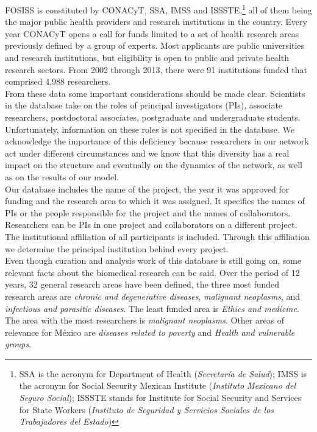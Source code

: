 \documentclass{bmcart}
\begin{document}
FOSISS is constituted by CONACyT, SSA, IMSS and ISSSTE,\footnote{SSA
  is the acronym for Department of Health (\emph{Secretar\'ia de
    Salud}); IMSS is the acronym for Social Security Mexican Institute
  (\emph{Instituto Mexicano del Seguro Social}); ISSSTE stands for
  Institute for Social Security and Services for State Workers
  (\emph{Instituto de Seguridad y Servicios Sociales de los
    Trabajadores del Estado})} all of them being the major public
health providers and research institutions in the country. Every year
CONACyT opens a call for funds limited to a set of health research
areas previously defined by a group of experts. Most applicants are
public universities and research institutions, but eligibility is open
to public and private health research sectors.  From 2002 through
2013, there were 91 institutions funded that comprised 4,988
researchers.\\

From these data some important considerations should be made
clear. Scientists in the database take on the roles of principal
investigators (PIs), associate researchers, postdoctoral associates,
postgraduate and undergraduate students.  Unfortunately, information
on these roles is not specified in the database.  We acknowledge the
importance of this deficiency because researchers in our network act
under different circumstances and we know that this diversity has a
real impact on the structure and eventually on the dynamics of the
network, as well as on the results of our model.\\

Our database includes the name of the project, the year it was
approved for funding and the research area to which it was
assigned. It specifies the names of PIs or the people responsible for
the project and the names of collaborators.  Researchers can be PIs in
one project and collaborators on a different project. The
institutional affiliation of all participants is included. Through
this affiliation we determine the principal institution behind every
project.\\

Even though curation and analysis work of this database is still going
on, some relevant facts about the biomedical research can be
said. Over the period of 12 years, 32 general research areas have been
defined, the three most funded research areas are \emph{chronic and
  degenerative diseases}, \emph{malignant neoplasms}, and
\emph{infectious and parasitic diseases}. The least funded area is
\emph{Ethics and medicine}. The area with the most researchers is
\emph{malignant neoplasms}. Other areas of relevance for M\'exico are
\emph{diseases related to poverty} and \emph{Health and vulnerable
  groups}. \\
\end{document}

